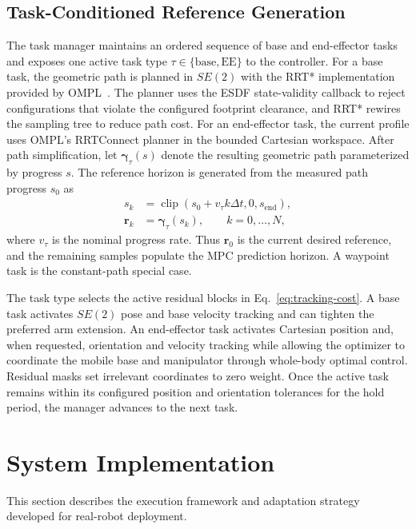\documentclass[conference]{IEEEtran}
\newcommand{\vect}[1]{\boldsymbol{#1}}
\begin{document}
\subsection{Task-Conditioned Reference Generation}

The task manager maintains an ordered sequence of base and end-effector tasks
and exposes one active task type
$\tau\in\{\mathrm{base},\mathrm{EE}\}$ to the controller.  For a base task,
the geometric path is planned in $SE(2)$ with the RRT* implementation provided
by OMPL~\cite{sucan2012ompl,karaman2011sampling}.  The planner uses the ESDF
state-validity callback to reject configurations that violate the configured
footprint clearance, and RRT* rewires the sampling tree to reduce path cost.
For an end-effector task, the current profile uses OMPL's RRTConnect planner in
the bounded Cartesian workspace.  After path simplification, let
$\vect{\gamma}_{\tau}(s)$ denote the resulting geometric path parameterized by
progress $s$.  The reference horizon is generated from the measured path
progress $s_0$ as
\begin{align}
s_k&=\operatorname{clip}(s_0+v_{\tau}k\Delta t,0,s_{\mathrm{end}}),\nonumber\\
\vect{r}_k&=\vect{\gamma}_{\tau}(s_k),\qquad k=0,\ldots,N,
\label{eq:reference-horizon}
\end{align}
where $v_{\tau}$ is the nominal progress rate.  Thus $\vect{r}_0$ is the
current desired reference, and the remaining samples populate the MPC
prediction horizon.  A waypoint task is the constant-path special case.

The task type selects the active residual blocks in
Eq.~\eqref{eq:tracking-cost}.  A base task activates $SE(2)$ pose and base
velocity tracking and can tighten the preferred arm extension.  An
end-effector task activates Cartesian position and, when requested,
orientation and velocity tracking while allowing the optimizer to coordinate
the mobile base and manipulator through whole-body optimal control.  Residual
masks set irrelevant coordinates to zero weight.  Once the active task remains
within its configured position and orientation tolerances for the hold period,
the manager advances to the next task.
\section{System Implementation}

This section describes the execution framework and adaptation strategy
developed for real-robot deployment.
\end{document}
